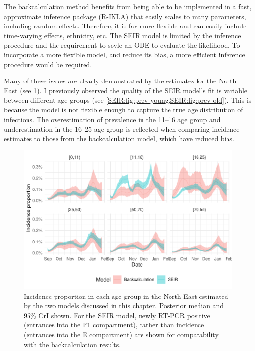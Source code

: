\documentclass[thesis.tex]{subfiles}
\begin{document}
The backcalculation method benefits from being able to be implemented in a fast, approximate inference package (R-INLA) that easily scales to many parameters, including random effects.
Therefore, it is far more flexible and can easily include time-varying effects, ethnicity, etc.
The SEIR model is limited by the inference procedure and the requirement to sovle an ODE to evaluate the likelihood.
To incorporate a more flexible model, and reduce its bias, a more efficient inference procedure would be required.

Many of these issues are clearly demonstrated by the estimates for the North East (see \cref{transmission:fig:compare-NE}).
I previously observed the quality of the SEIR model's fit is variable between different age groups (see \cref{SEIR:fig:prev-young,SEIR:fig:prev-old}).
This is because the model is not flexible enough to capture the true age distribution of infections.
The overestimation of prevalence in the 11--16 age group and underestimation in the 16--25 age group is reflected when comparing incidence estimates to those from the backcalculation model, which have reduced bias.
\begin{figure}
    \centering \includegraphics{transmission/compare-NE}
    \caption[Comparing each models estimate of North East incidence by age.]{%
        Incidence proportion in each age group in the North East estimated by the two models discussed in this chapter.
        Posterior median and 95\% CrI shown.
        For the SEIR model, newly RT-PCR positive (entrances into the P1 compartment), rather than incidence (entrances into the E compartment) are shown for comparability with the backcalculation results.
    }
    \label{transmission:fig:compare-NE}
\end{figure}
\end{document}
